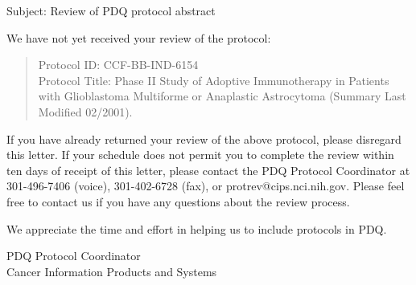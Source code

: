 \documentclass[letterpaper,12pt]{letter}
\begin{document}
\vspace{12pt}

Subject: Review of PDQ protocol abstract

We have not yet received your review of the protocol:

\begin{verse}

Protocol ID: CCF-BB-IND-6154 \\
Protocol Title: Phase II Study of Adoptive Immunotherapy in Patients 
with Glioblastoma Multiforme or Anaplastic Astrocytoma (Summary Last Modified
02/2001).

\end{verse}

If you have already returned your review of the above protocol, please
disregard this letter.  If your schedule does not permit you to complete 
the review within ten days of receipt of this letter, please contact
the PDQ Protocol Coordinator at 301-496-7406 (voice), 301-402-6728 (fax),
or protrev@cips.nci.nih.gov.  Please feel free to contact us if you 
have any questions about the review process.

We appreciate the time and effort in helping us to include protocols
in PDQ.

\vspace{12pt}

PDQ Protocol Coordinator \\
Cancer Information Products and Systems

\vfill
\end{document}
